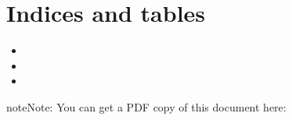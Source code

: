 \documentclass[letterpaper,10pt,english]{sphinxmanual}
\begin{document}
\chapter{Indices and tables}
\label{\detokenize{index:indices-and-tables}}\begin{itemize}
\item {} 
\sphinxAtStartPar
{}

\item {} 
\sphinxAtStartPar
{}

\item {} 
\sphinxAtStartPar
{}

\end{itemize}

\begin{sphinxadmonition}{note}{Note:}
\sphinxAtStartPar
You can get a PDF copy of this document here: 
\end{sphinxadmonition}



\renewcommand{\indexname}{Index}
\printindex
\end{document}
